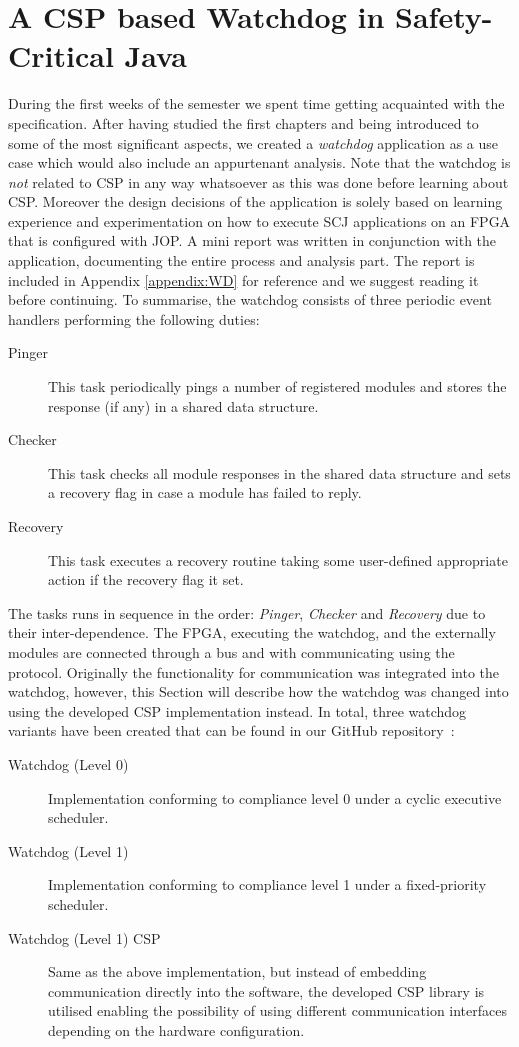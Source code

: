 \chapter{A CSP based Watchdog in Safety-Critical Java}
\label{chapter:watchdogcsp}
During the first weeks of the semester we spent time getting acquainted with the specification. After having studied the first chapters and being introduced to some of the most significant aspects, we created a \textit{watchdog} application as a use case which would also include an appurtenant analysis. Note that the watchdog is \textit{not} related to CSP in any way whatsoever as this was done before learning about CSP. Moreover the design decisions of the application is solely based on learning experience and experimentation on how to execute SCJ applications on an FPGA that is configured with JOP. A mini report was written in conjunction with the application, documenting the entire process and analysis part. The report is included in Appendix \ref{appendix:WD} for reference and we suggest reading it before continuing. To summarise, the watchdog consists of three periodic event handlers performing the following duties:

\begin{description}
	\item[Pinger] This task periodically pings a number of registered modules and stores the response (if any) in a shared data structure.
	\item[Checker] This task checks all module responses in the shared data structure and sets a recovery flag in case a module has failed to reply.
	\item[Recovery] This task executes a recovery routine taking some user-defined appropriate action if the recovery flag it set. 
\end{description}

The tasks runs in sequence in the order: \textit{Pinger}, \textit{Checker} and \textit{Recovery} due to their inter-dependence. The FPGA, executing the watchdog, and the externally modules are connected through a bus and with communicating using the \iic protocol. Originally the functionality for \iic communication was integrated into the watchdog, however, this Section will describe how the watchdog was changed into using the developed CSP implementation instead. In total, three watchdog variants have been created that can be found in our GitHub repository~\cite{SW902e12:CSPinSCJ}:

\begin{description}
	\item[Watchdog (Level 0)] Implementation conforming to compliance level 0 under a cyclic executive scheduler.
	\item[Watchdog (Level 1)] Implementation conforming to compliance level 1 under a fixed-priority scheduler. 
	\item[Watchdog (Level 1) CSP] Same as the above implementation, but instead of embedding \iic communication directly into the software, the developed CSP library is utilised enabling the possibility of using different communication interfaces depending on the hardware configuration.
\end{description}

